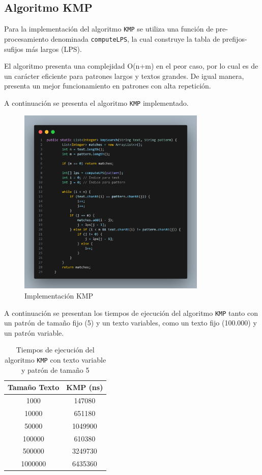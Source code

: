 \documentclass[12pt]{article}
\begin{document}
	\subsection{Algoritmo KMP}
	Para la implementación del algoritmo \texttt{KMP} se utiliza una función de pre-procesamiento denominada \texttt{computeLPS}, la cual construye la tabla de prefijos-sufijos más largos (LPS).
	
	El algoritmo presenta una complejidad O(n+m) en el peor caso, por lo cual es de un carácter eficiente para patrones largos y textos grandes. De igual manera, presenta un mejor funcionamiento en patrones con alta repetición.
	
	A continuación se presenta el algoritmo \texttt{KMP} implementado.
	
	\begin{figure}[H]
		\centering
		\includegraphics[width=0.8\textwidth]{KMP.png}
		\caption{Implementación KMP}
		\label{fig: Algoritmo KMP}
	\end{figure}
	
	A continuación se presentan los tiempos de ejecución del algoritmo \texttt{KMP}  tanto con un patrón de tamaño fijo (5) y un texto variables, como un texto fijo (100.000) y un patrón variable.
	
	\begin{table}[H]
		\centering
		\begin{tabular}{|c|c|}
			\hline
			\textbf{Tamaño Texto} & \textbf{KMP (ns)} \\
			\hline
			1000     & 147080   \\
			10000    & 651180   \\
			50000    & 1049900  \\
			100000   & 610380   \\
			500000   & 3249730  \\
			1000000  & 6435360  \\
			\hline
		\end{tabular}
		\caption{Tiempos de ejecución del algoritmo \texttt{KMP} con texto variable y patrón de tamaño 5}
		\label{tab:kmp}
	\end{table}
	
\end{document}
